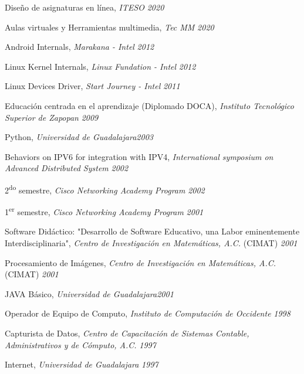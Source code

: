 
\begin{loneinnerlist}
  \item Diseño de asignaturas en línea, \emph{ITESO} \hfill{\emph{2020}}
  \item Aulas virtuales y Herramientas multimedia, \emph{Tec MM} \hfill{\emph{2020}}
  \item Android Internals, \emph{Marakana - Intel} \hfill{\emph{2012}}
  \item Linux Kernel Internals, \emph{Linux Fundation - Intel} \hfill{\emph{2012}}
  \item Linux Devices Driver, \emph{Start Journey - Intel} \hfill{\emph{2011}}
  \item Educación centrada en el aprendizaje (Diplomado DOCA),
        \emph{Instituto Tecnológico Superior de Zapopan} \hfill{\emph{2009}}
  \item Python, \emph{Universidad de Guadalajara}\hfill{\emph{2003}}
  \item Behaviors on IPV6 for integration with IPV4, \emph{International
        symposium on Advanced Distributed System} \hfill{\emph{2002}}
  \item 2\textsuperscript{do} semestre, \emph{Cisco Networking Academy
        Program} \hfill{\emph{2002}}
  \item 1\textsuperscript{er} semestre, \emph{Cisco Networking Academy
        Program} \hfill{\emph{2001}}
  \item Software Didáctico: "Desarrollo de Software Educativo, una Labor
        eminentemente Interdisciplinaria", \emph{Centro de Investigación
        en Matemáticas, A.C.} (CIMAT) \hfill{\emph{2001}}
  \item Procesamiento de Imágenes, \emph{Centro de Investigación
        en Matemáticas, A.C.} (CIMAT) \hfill{\emph{2001}}
  \item JAVA Básico, \emph{Universidad de Guadalajara}\hfill{\emph{2001}}
  \item Operador de Equipo de Computo, \emph{Instituto de Computación de
        Occidente} \hfill{\emph{1998}}
  \item Capturista de Datos, \emph{Centro de Capacitación de Sistemas
        Contable, Administrativos y de Cómputo, A.C.} \hfill{\emph{1997}}
  \item Internet, \emph{Universidad de Guadalajara} \hfill{\emph{1997}}
\end{loneinnerlist}
